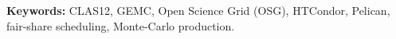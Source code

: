 

\begin{center}
\begin{minipage}{0.86\textwidth}
\small\textbf{Keywords:} CLAS12, GEMC, Open Science Grid (OSG), HTCondor, Pelican, fair-share
scheduling, Monte-Carlo production.
\end{minipage}
\end{center}
\vspace{6pt}


\setcounter{tocdepth}{1}  %
\tableofcontents












